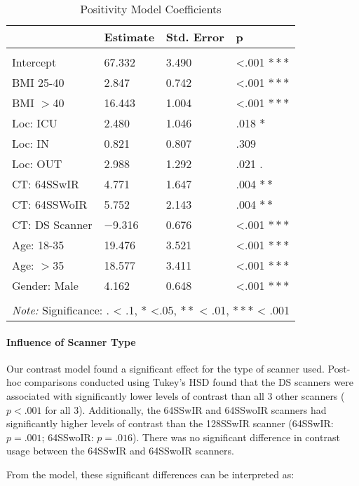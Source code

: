 \documentclass[]{article}
\let\oldparagraph\paragraph
\renewcommand{\paragraph}[1]{\oldparagraph{#1}\mbox{}}
\begin{document}
\begin{table}[H] \centering 
  \caption{Positivity Model Coefficients} 
\begin{tabular}{p{3cm}|p{3cm}p{3cm}p{3cm}}
\\[-1.8ex] \hline 
\hline
 & Estimate & Std. Error & p  \\
\hline \\[-1.8ex] 
 Intercept   & 67.332 & 3.490 & <.001 $***$ \\
 BMI 25-40   & 2.847 & 0.742 & <.001 $***$\\
 BMI $>$40   & 16.443 & 1.004 & <.001 $***$\\
 Loc: ICU    & 2.480 & 1.046 & .018 $*$\\
 Loc: IN     & 0.821 & 0.807 & .309 \\
 Loc: OUT    & 2.988 & 1.292 & .021 $.$\\
 CT: 64SSwIR & 4.771 & 1.647 & .004 $**$\\
 CT: 64SSWoIR & 5.752 & 2.143 & .004 $**$ \\
 CT: DS Scanner & $-$9.316 & 0.676 & <.001 $***$\\
 Age: 18-35 & 19.476 & 3.521 & <.001 $***$\\
 Age: $>$35 & 18.577 & 3.411 & <.001 $***$ \\
 Gender: Male & 4.162 & 0.648 & <.001 $***$ \\
\hline 
\hline \\[-1.8ex]
\multicolumn{4}{l}{\textit{Note:} Significance: $.$ < .1, $*$ <.05, $**$ < .01, $***$ < .001}
 \end{tabular}
\end{table}

\paragraph{Influence of Scanner Type}\label{influence-of-scanner-type}

Our contrast model found a significant effect for the type of scanner
used. Post-hoc comparisons conducted using Tukey's HSD found that the DS
scanners were associated with significantly lower levels of contrast
than all 3 other scanners (\(p<.001\) for all 3). Additionally, the
64SSwIR and 64SSwoIR scanners had significantly higher levels of
contrast than the 128SSwIR scanner (64SSwIR: \(p = .001\); 64SSwoIR:
\(p = .016\)). There was no significant difference in contrast usage
between the 64SSwIR and 64SSwoIR scanners.

From the model, these significant differences can be interpreted as:
\end{document}
